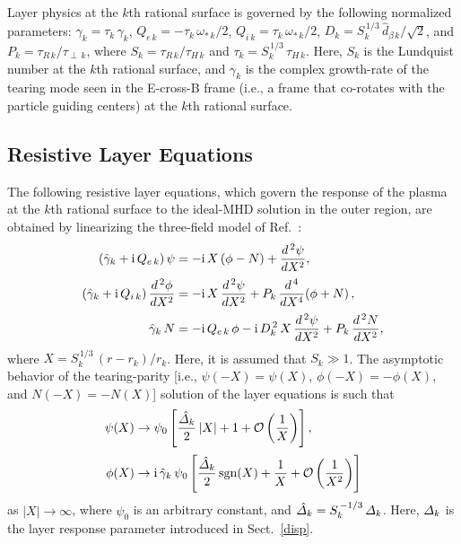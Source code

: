 \documentclass[12pt,prb,aps]{revtex4-1}
\begin{document}
Layer physics at the $k$th rational surface is governed by the following normalized parameters:
$\hat{\gamma}_k= \tau_k\,\gamma_k$, 
$Q_{e\,k }= - \tau_k\,\omega_{\ast\,k}/2$, 
$Q_{i\,k }=  \tau_k\,\omega_{\ast\,k}/2$, 
$D_k = S_{k}^{\,1/3}\,\hat{d}_{\beta\,k}/\sqrt{2}$, 
and $P_{k} = \tau_{R\,k}/\tau_{\perp\,k}$, 
where $S_k = \tau_{R\,k}/\tau_{H\,k}$ and 
$\tau_k = S_k^{\,1/3} \,\tau_{H\,k}$.   Here, $S_k$ is the Lundquist number at the $k$th rational surface, and $\gamma_k$ is the complex growth-rate of the tearing mode seen in the E-cross-B frame (i.e., a frame that co-rotates with the
particle guiding centers) at the $k$th rational surface.

\subsection{Resistive Layer Equations}\label{rlayer}
The following resistive layer equations, which govern the response of the plasma at the $k$th rational surface to the ideal-MHD solution in the outer region,  are obtained by linearizing the three-field model of Ref.~:
\begin{align}\label{e80y}
(\hat{\gamma}_k+{\rm i}\,Q_{e\,k})\,\psi&= - {\rm i}\,X\left(\phi-N\right) + \frac{d^{\,2}\psi}{d X^2},\\[0.5ex]
(\hat{\gamma}_k+{\rm i}\,Q_{i\,k})\,\frac{d^{\,2}\phi}{d X^2}&= - {\rm i}\,X\,\frac{d^{\,2}\psi}{d X^2}+ P_{k}\,\frac{d^{\,4}}{d X^4}\!\left(\phi + N\right),\\[0.5ex]
\hat{\gamma}_k\,N&= - {\rm i}\,Q_{e\,k}\,\phi  - {\rm i} \,D_k^{\,2}\,X\,\frac{d^{\,2}\psi}{d X^{2}}
+ P_{k}\,\frac{d^{\,2} N}{d X^{2}},\label{e82y}
\end{align}
where $X=S_k^{\,1/3}\,(r-r_k)/r_k$. Here, it is assumed that $S_k\gg 1$.  The asymptotic behavior of the tearing-parity [i.e., $\psi(-X)=\psi(X)$, $\phi(-X)= -\phi(X)$, and $N(-X)=-N(X)$] solution of the layer
equations is such that
\begin{align}\label{e47y}
\psi(X)&\rightarrow  \psi_0\left[\frac{\hat{\mit\Delta}_k}{2}\,|X| +1 + {\cal O}\left(\frac{1}{X}\right)\right],\\[0.5ex]
\phi(X)&\rightarrow  {\rm i}\,\hat{\gamma}_k\,\psi_0\left[\frac{\hat{\mit\Delta}_k}{2}\,{\rm sgn}(X) +\frac{1}{X} + {\cal O}\left(\frac{1}{X^2}\right)\right]\label{e85y}
\end{align}
as $|X|\rightarrow\infty$, where $\psi_0$ is an arbitrary constant, and 
$\hat{\mit\Delta}_k = S_k^{\,-1/3}\,{\mit\Delta}_k$. Here, ${\mit\Delta}_k$ is the layer response parameter introduced in Sect.~\ref{disp}. 
\end{document}
